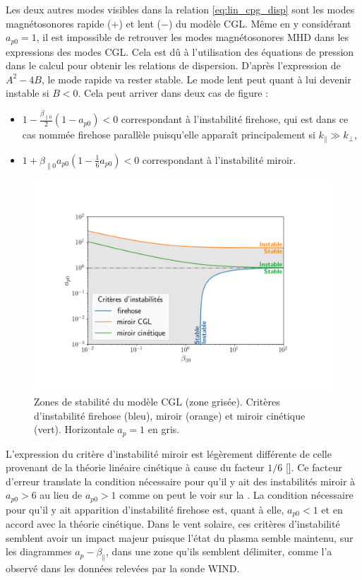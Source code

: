 Les deux autres modes visibles dans la relation \eqref{eq:lin_cpg_disp} sont les modes magnétosonores rapide ($+$) et lent ($-$) du modèle \ac{CGL}. Même en y considérant $a_{p0}=1$, il est impossible de retrouver les modes magnétosonores \ac{MHD} dans les expressions des modes \ac{CGL}. Cela est dû à l'utilisation des équations de pression dans le calcul pour obtenir les relations de dispersion. D'après l'expression de $A^2 -4B$, le mode rapide va rester stable. Le mode lent peut quant à lui devenir instable si $B < 0 $. Cela peut arriver dans deux cas de figure : 
\begin{itemize}
    \item $1-\frac{\beta_{\parallel 0}}{2} \left(1-a_{p0}\right)<0$ correspondant à l'instabilité firehose, qui est dans ce cas nommée firehose parallèle puisqu'elle apparaît principalement si $k_{\parallel}\gg k_{\perp}$, 
    \item $1+\beta_{\parallel 0}a_{p0}\left(1-\frac{1}{6}a_{p0}\right)<0$ correspondant à l'instabilité miroir. 
\end{itemize}
\begin{figure}[!ht]
 \centering
\includegraphics[width=0.7\linewidth,trim=3cm 2cm 4cm 3cm, clip=true]{./Part_2/images/crit_diag_CGL}
\caption{Zones de stabilité du modèle \ac{CGL} (zone grisée). Critères d'instabilité firehose (bleu), miroir (orange) et miroir cinétique (vert). Horizontale $a_p=1$ en gris.}
\label{fig:diag_cgl}
\end{figure}
L'expression du critère d'instabilité miroir est légèrement différente de celle provenant de la théorie linéaire cinétique à cause du facteur $1/6$ [\cite{galeev_mhd_1983,ferriere_mixed_2002}]. Ce facteur d'erreur translate la condition nécessaire pour qu'il y ait des instabilités miroir à $a_{p0}>6$ au lieu de $a_{p0}>1$ comme on peut le voir sur la . La condition nécessaire pour qu'il y ait apparition d'instabilité firehose est, quant à elle, $a_{p0}<1$ et en accord avec la théorie cinétique. Dans le vent solaire, ces critères d'instabilité semblent avoir un impact majeur puisque l'état du plasma semble maintenu, sur les diagrammes $a_p-\beta_{\parallel}$, dans une zone qu'ils semblent délimiter, comme l'a observé \cite{hellinger_solar_2006} dans les données relevées par la sonde \acs{WIND}. 


